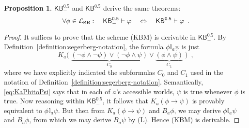 \documentclass[12pt]{article}
\theoremstyle{definition}
\newtheorem{proposition}[theorem]{Proposition}
\newcommand{\Lang}{{\cal L}}   %
\newcommand{\KB}{{\mathsf{KB}}}                        %
\newcommand{\KBeq}{{\mathsf{KB}^{\mathsf{0.5}}}}       %
\newcommand{\KBeqm}{{\mathsf{KB}^{\mathsf{0.5}}_{-}}}  %
\begin{document}
\begin{proposition}
  \label{prop:KBminus}
  $\KBeqm$ and $\KBeq$ derive the same theorems:
  \[
  \forall\phi\in\Lang_\KB:\quad
  \KBeqm\vdash\varphi \quad\Leftrightarrow\quad \KBeq\vdash\varphi\enspace.
  \]
\end{proposition}
\begin{proof}
  It suffices to prove that the scheme (KBM) is derivable in $\KBeqm$.
  By Definition~\ref{definition:segerberg-notation}, the formula
  $\phi\mathbb{I}_a\psi$ is just
  \begin{equation}
    K_a\bigl(\;
    \underbrace{(\lnot\phi\land\lnot\psi) \lor (\lnot\phi\land\psi)}_{C_0} \lor
    \underbrace{(\phi\land\psi)}_{C_1}
    \;\bigr)\enspace,
    \label{eq:KaPhitoPsi}
  \end{equation}
  where we have explicitly indicated the subformulas $C_0$ and $C_1$
  used in the notation of Definition~\ref{definition:segerberg-notation}.
  Semantically, \eqref{eq:KaPhitoPsi} says that in each of $a$'s accessible worlds,
  $\psi$ is true whenever $\phi$ is true.
  Now reasoning within $\KBeqm$, it follows that
  $K_a(\phi\to\psi)$ is provably equivalent to
  $\phi\mathbb{I}_a\psi$.  But then from
  $K_a(\phi\to\psi)$ and $B_a\phi$, we may derive
  $\phi\mathbb{I}_a\psi$ and $B_a\phi$, from which we may derive
  $B_a\psi$ by (L). Hence (KBM) is derivable.
\end{proof}
\end{document}
